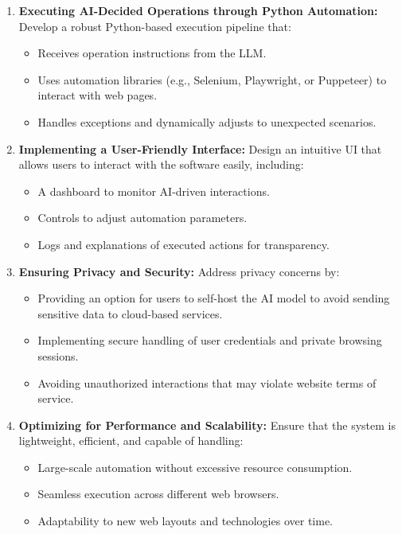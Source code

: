 \documentclass[conference]{IEEEtran}
\begin{document}
\begin{enumerate}
    \item \textbf{Executing AI-Decided Operations through Python Automation:}
          Develop a robust Python-based execution pipeline that:
          \begin{itemize}
              \item Receives operation instructions from the LLM.
              \item Uses automation libraries (e.g., Selenium, Playwright, or Puppeteer) to interact with web pages.
              \item Handles exceptions and dynamically adjusts to unexpected scenarios.
          \end{itemize}

    \item \textbf{Implementing a User-Friendly Interface:}
          Design an intuitive UI that allows users to interact with the software easily, including:
          \begin{itemize}
              \item A dashboard to monitor AI-driven interactions.
              \item Controls to adjust automation parameters.
              \item Logs and explanations of executed actions for transparency.
          \end{itemize}

    \item \textbf{Ensuring Privacy and Security:}
          Address privacy concerns by:
          \begin{itemize}
              \item Providing an option for users to self-host the AI model to avoid sending sensitive data to cloud-based services.
              \item Implementing secure handling of user credentials and private browsing sessions.
              \item Avoiding unauthorized interactions that may violate website terms of service.
          \end{itemize}

    \item \textbf{Optimizing for Performance and Scalability:}
          Ensure that the system is lightweight, efficient, and capable of handling:
          \begin{itemize}
              \item Large-scale automation without excessive resource consumption.
              \item Seamless execution across different web browsers.
              \item Adaptability to new web layouts and technologies over time.
          \end{itemize}

\end{enumerate}
\end{document}
